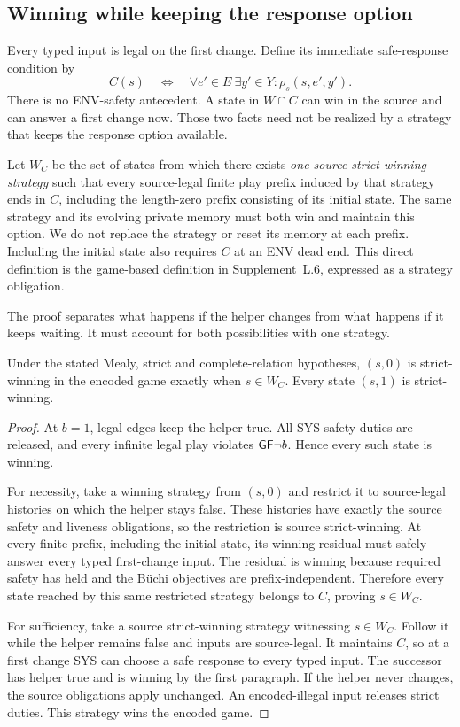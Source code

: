 \subsection{Winning while keeping the response option}
Every typed input is legal on the first change. Define its immediate
safe-response condition by
\begin{equation}
C(s)\quad\Longleftrightarrow\quad
\forall e'\in E\ \exists y'\in Y:\rho_s(s,e',y').
\label{hpb:C}
\end{equation}
There is no ENV-safety antecedent. A state in $W\cap C$ can win in the
source and can answer a first change now. Those two facts need not be
realized by a strategy that keeps the response option available.

Let $W_C$ be the set of states from which there exists \emph{one source
strict-winning strategy} such that every source-legal finite play prefix
induced by that strategy ends in $C$, including the length-zero prefix
consisting of its initial state. The same strategy and its evolving private
memory must both win and maintain this option. We do not replace the strategy
or reset its memory at each prefix. Including the initial state also requires
$C$ at an ENV dead end. This direct definition is the game-based definition
in Supplement~L.6, expressed as a strategy obligation.

The proof separates what happens if the helper changes from what happens
if it keeps waiting. It must account for both possibilities with one strategy.
\begin{theorem}\label{hpb:exact}
Under the stated Mealy, strict and complete-relation hypotheses,
$(s,0)$ is strict-winning in the encoded game exactly when $s\in W_C$.
Every state $(s,1)$ is strict-winning.
\end{theorem}
\begin{proof}
At $b=1$, legal edges keep the helper true. All SYS safety duties are
released, and every infinite legal play violates $\mathsf{G}\mathsf{F}\neg b$.
Hence every such state is winning.

For necessity, take a winning strategy from $(s,0)$ and restrict it to
source-legal histories on which the helper stays false. These histories
have exactly the source safety and liveness obligations, so the restriction
is source strict-winning. At every finite prefix, including the initial
state, its winning residual must safely answer every typed first-change
input. The residual is winning because required safety has held and the
B\"uchi objectives are prefix-independent. Therefore every state reached
by this same restricted strategy belongs to $C$, proving $s\in W_C$.

For sufficiency, take a source strict-winning strategy witnessing
$s\in W_C$. Follow it while the helper remains false and inputs are
source-legal. It maintains $C$, so at a first change SYS can choose a safe
response to every typed input. The successor has helper true and is winning
by the first paragraph. If the helper never changes, the source obligations
apply unchanged. An encoded-illegal input releases strict duties. This
strategy wins the encoded game.
\end{proof}

